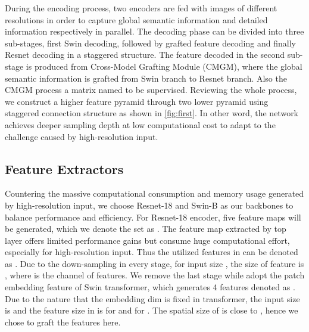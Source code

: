 \documentclass[10pt,twocolumn,letterpaper]{article}
\begin{document}
During the encoding process, two encoders are fed with images of different resolutions in order to capture global semantic information and detailed information respectively in parallel. The decoding phase can be divided into three sub-stages, first Swin decoding, followed by grafted feature decoding and finally Resnet decoding in a staggered structure. The feature decoded in the second sub-stage is produced from Cross-Model Grafting Module (CMGM), where the global semantic information is grafted from Swin branch to Resnet branch. Also the CMGM process a matrix named  to be supervised. Reviewing the whole process, we construct a higher feature pyramid through two lower pyramid using  staggered connection structure as shown in \cref{fig:first}. In other word, the network achieves deeper sampling depth at low computational cost to adapt to the challenge caused by high-resolution input.

\subsection{Feature Extractors}
Countering the massive computational consumption and memory usage generated by high-resolution input, we choose Resnet-18 \cite{he2016deep} and Swin-B \cite{liu2021swin} as our backbones to balance performance and efficiency. For Resnet-18 encoder, five feature maps will be generated, which we denote the set as . The feature map extracted by top  layer offers limited performance gains but consume huge computational effort, especially for high-resolution input. Thus the utilized features in  can be denoted as . Due to the down-sampling in every stage,  for input size , the size of feature  is , where  is the channel of features. We remove the last stage while adopt the patch embedding feature of Swin transformer, which generates 4 features denoted as . Due to the nature that the embedding dim is fixed in transformer, the input size is  and the feature size in  is for  and  for .  The spatial size of  is close to , hence we chose to graft the features here.
\label{subsec:feature extracter}
\end{document}

